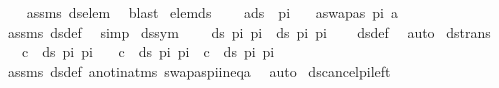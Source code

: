 \begin{isabellebody}
%
\isadelimproof
\ \ %
\endisadelimproof
%
\isatagproof
{}\isamarkupfalse%
\ assms\ ds{\isacharunderscore}{\kern0pt}elem\ \isamarkupfalse%
\ blast%
\endisatagproof
{\isafoldproof}%
%
\isadelimproof
\isanewline
%
\endisadelimproof
\isanewline
{}\isamarkupfalse%
\ elem{\isacharunderscore}{\kern0pt}ds{\isacharcolon}{\kern0pt}\ \isanewline
\ \ \ {\isachardoublequoteopen}a{\isasymin}ds\ {\isacharbrackleft}{\kern0pt}{\isacharbrackright}{\kern0pt}\ pi{\isachardoublequoteclose}\isanewline
\ \ \ {\isachardoublequoteopen}a{\isasymnoteq}swapas\ pi\ a{\isachardoublequoteclose}\isanewline
%
\isadelimproof
\ \ %
\endisadelimproof
%
\isatagproof
{}\isamarkupfalse%
\ assms\ ds{\isacharunderscore}{\kern0pt}def\ \isamarkupfalse%
\ simp%
\endisatagproof
{\isafoldproof}%
%
\isadelimproof
\isanewline
%
\endisadelimproof
\isanewline
{}\isamarkupfalse%
\ ds{\isacharunderscore}{\kern0pt}sym{\isacharcolon}{\kern0pt}\ \isanewline
\ \ \ {\isachardoublequoteopen}ds\ pi{}\ pi{}\ {\isacharequal}{\kern0pt}\ ds\ pi{}\ pi{}{\isachardoublequoteclose}\isanewline
%
\isadelimproof
\ \ %
\endisadelimproof
%
\isatagproof
{}\isamarkupfalse%
\ ds{\isacharunderscore}{\kern0pt}def\ \isamarkupfalse%
\ auto%
\endisatagproof
{\isafoldproof}%
%
\isadelimproof
\isanewline
%
\endisadelimproof
\isanewline
{}\isamarkupfalse%
\ ds{\isacharunderscore}{\kern0pt}trans{\isacharcolon}{\kern0pt}\ \isanewline
\ \ \ {\isachardoublequoteopen}c\ {\isasymin}\ ds\ pi{}\ pi{}{\isachardoublequoteclose}\isanewline
\ \ \ {\isachardoublequoteopen}c\ {\isasymin}\ ds\ pi{}\ pi{}\ {\isasymor}\ c\ {\isasymin}\ ds\ pi{}\ pi{}{\isachardoublequoteclose}\isanewline
%
\isadelimproof
%
\endisadelimproof
%
\isatagproof
{}\isamarkupfalse%
\ assms\ ds{\isacharunderscore}{\kern0pt}def\ a{\isacharunderscore}{\kern0pt}not{\isacharunderscore}{\kern0pt}in{\isacharunderscore}{\kern0pt}atms\ swapas{\isacharunderscore}{\kern0pt}pi{\isacharunderscore}{\kern0pt}ineq{\isacharunderscore}{\kern0pt}a\ \isamarkupfalse%
\ auto%
\endisatagproof
{\isafoldproof}%
%
\isadelimproof
\isanewline
%
\endisadelimproof
\isanewline
{}\isamarkupfalse%
\ ds{\isacharunderscore}{\kern0pt}cancel{\isacharunderscore}{\kern0pt}pi{\isacharunderscore}{\kern0pt}left{\isacharcolon}{\kern0pt}\isanewline

\end{isabellebody}
